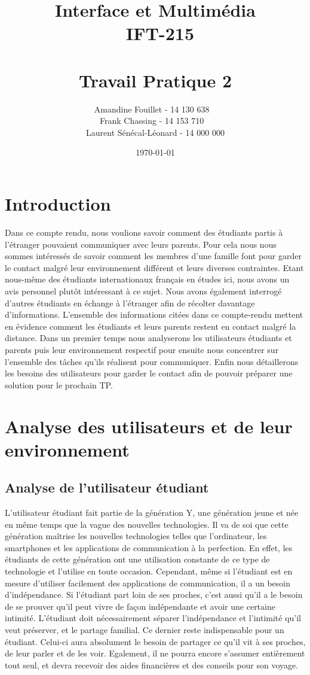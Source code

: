 \documentclass[12pt]{article}
\title{\vspace{\fill} Interface et Multimédia \\ ~\textbf{IFT-215} \\~\\ Travail Pratique 2}
\author{Amandine Fouillet - 14 130 638 ~\\ Frank Chassing - 14 153 710 ~\\ Laurent Sénécal-Léonard - 14 000 000}
\date{\today \vspace{\fill}}
\begin{document}
\maketitle
\newpage

\tableofcontents
\newpage
\section{Introduction}

Dans ce compte rendu, nous voulions savoir comment des étudiants partis à l’étranger pouvaient communiquer avec leurs parents. Pour cela nous nous sommes intéressés de savoir comment les membres d’une famille font pour garder le contact malgré leur environnement différent et leurs diverses contraintes. Etant nous-même des étudiants internationaux français en études ici, nous avons un avis personnel plutôt intéressant à ce sujet. Nous avons également interrogé d’autres étudiants en échange à l’étranger afin de récolter davantage d’informations. L’ensemble des informations citées dans ce compte-rendu mettent en évidence comment les étudiants et leurs parents restent en contact malgré la distance. Dans un premier temps nous analyserons les utilisateurs étudiants et parents puis leur environnement respectif pour ensuite nous concentrer sur l’ensemble des tâches qu’ils réalisent pour communiquer. Enfin nous détaillerons les besoins des utilisateurs pour garder le contact afin de pouvoir préparer une solution pour le prochain TP. 


\section{Analyse des utilisateurs et de leur environnement}

\subsection{Analyse de l’utilisateur étudiant}

L’utilisateur étudiant fait partie de la génération Y, une génération jeune et née en même temps que la vague des nouvelles technologies. Il va de soi que cette génération maîtrise les nouvelles technologies telles que l’ordinateur, les smartphones et les applications de communication à la perfection.  En effet, les étudiants de cette génération ont une utilisation constante de ce type de technologie et l’utilise en toute occasion. Cependant, même si l’étudiant est en mesure d’utiliser facilement des applications de communication, il a un besoin d’indépendance. Si l’étudiant part loin de ses proches, c’est aussi qu’il a le besoin de se prouver qu’il peut vivre de façon indépendante et avoir une certaine intimité. L’étudiant doit nécessairement séparer l’indépendance et l’intimité qu’il veut préserver, et  le partage familial. Ce dernier reste indispensable pour un étudiant. Celui-ci aura absolument le besoin de partager ce qu’il vit à ses proches, de leur parler et de les voir.  Egalement, il ne pourra encore s’assumer entièrement tout seul, et devra recevoir des aides financières et des conseils pour son voyage.
\end{document}
